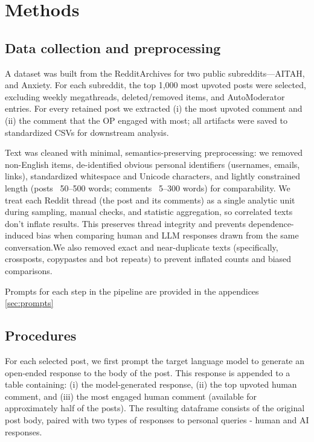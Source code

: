 \section{Methods} \label{sec:Methods}

\subsection{Data collection and preprocessing}
A dataset was built from the RedditArchives for two public subreddits—AITAH, and Anxiety. For each subreddit, the top 1,000 most upvoted posts were selected, excluding weekly megathreads, deleted/removed items, and AutoModerator entries. For every retained post we extracted (i) the most upvoted comment and (ii) the comment that the OP engaged with most; all artifacts were saved to standardized CSVs for downstream analysis.

Text was cleaned with minimal, semantics-preserving preprocessing: we removed non-English items, de-identified obvious personal identifiers (usernames, emails, links), standardized whitespace and Unicode characters, and lightly constrained length (posts ~50–500 words; comments ~5–300 words) for comparability. We treat each Reddit thread (the post and its comments) as a single analytic unit during sampling, manual checks, and statistic aggregation, so correlated texts don’t inflate results. This preserves thread integrity and prevents dependence-induced bias when comparing human and LLM responses drawn from the same conversation.We also removed exact and near-duplicate texts (specifically, crossposts, copypastes and bot repeats) to prevent inflated counts and biased comparisons.

\smallskip Prompts for each step in the pipeline are provided in the appendices \ref{sec:prompts}

\subsection{Procedures}
For each selected post, we first prompt the target language model to generate an open-ended response to the body of the post. This response is appended to a table containing: (i) the model-generated response, (ii) the top upvoted human comment, and (iii) the most engaged human comment (available for approximately half of the posts). The resulting dataframe consists of the original post body, paired with two types of responses to personal queries - human and AI responses.

